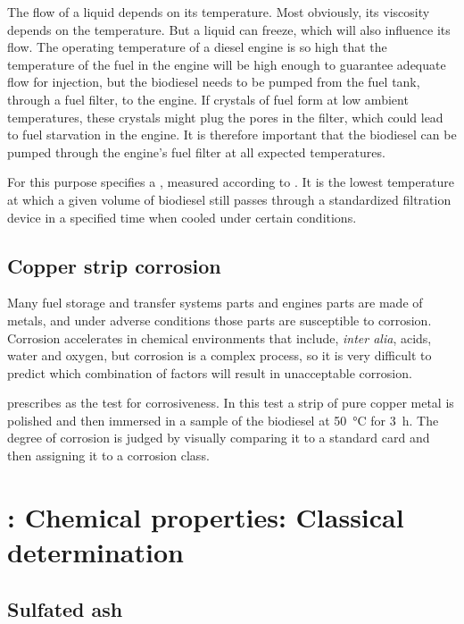 The flow of a liquid depends on its temperature. Most obviously, its viscosity
depends on the temperature. But a liquid can freeze, which will also influence
its flow. The operating temperature of a diesel engine is so high that the
temperature of the fuel in the engine will be high enough to guarantee adequate
flow for injection, but the biodiesel needs to be pumped from the fuel tank,
through a fuel filter, to the engine. If crystals of fuel form at low ambient
temperatures, these crystals might plug the pores in the filter, which could
lead to fuel starvation in the engine. It is therefore important that the
biodiesel can be pumped through the engine's fuel filter at all expected
temperatures.

For this purpose  specifies a , measured according to . It is the lowest temperature at
which a given volume of biodiesel still passes through a standardized filtration
device in a specified time when cooled under certain conditions.

\subsection{Copper strip corrosion}

Many fuel storage  and transfer systems parts and engines parts are made of
metals, and under adverse conditions those parts are susceptible to corrosion.
Corrosion accelerates in chemical environments that include, \textit{inter
alia}, acids, water and oxygen, but corrosion is a complex process, so it is
very difficult to predict which combination of factors will result in
unacceptable corrosion.

 prescribes  as the test for corrosiveness. In this
test a strip of pure copper metal is polished and then immersed in a sample of
the biodiesel at \SI{50}{\celsius} for \SI{3}{\hour}. The degree of corrosion is
judged by visually comparing it to a standard card and then assigning it to a
corrosion class.

\section{: Chemical properties: Classical determination}

\subsection{Sulfated ash}

